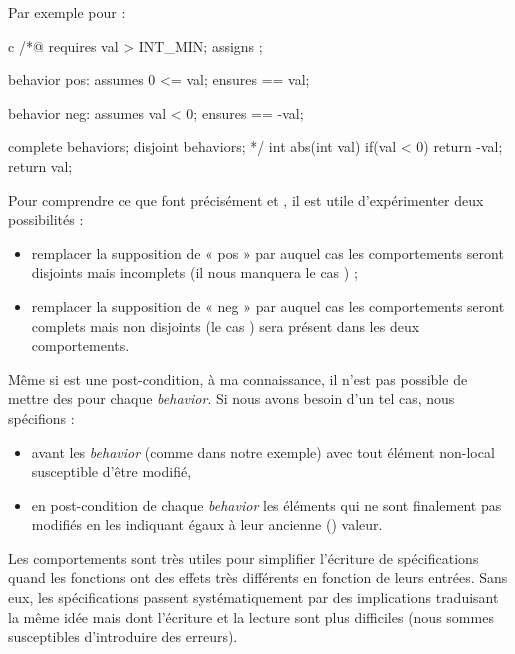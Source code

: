 \documentclass[middle]{zmdocument}
\begin{document}
Par exemple pour  :



\begin{CodeBlock}{c}
/*@
  requires val > INT_MIN;
  assigns  \nothing;

  behavior pos:
    assumes 0 <= val;
    ensures \result == val;
  
  behavior neg:
    assumes val < 0;
    ensures \result == -val;
 
  complete behaviors;
  disjoint behaviors;
*/
int abs(int val){
  if(val < 0) return -val;
  return val;
}
\end{CodeBlock}



Pour comprendre ce que font précisément  et , il est utile
d'expérimenter deux possibilités :



\begin{itemize}
\item remplacer la supposition de « pos » par  auquel cas les 
comportements seront disjoints mais incomplets (il nous manquera le cas 
) ;
\item remplacer la supposition de « neg » par  auquel cas les 
comportements seront complets mais non disjoints (le cas ) sera
présent dans les deux comportements.
\end{itemize}


\begin{Warning}
Même si  est une post-condition, à ma connaissance, il n'est pas 
possible de mettre des  pour chaque \textit{behavior}. Si nous avons
besoin d'un tel cas, nous spécifions :

\begin{itemize}
\item {} avant les \textit{behavior} (comme dans notre exemple) avec tout 
élément non-local susceptible d'être modifié,
\item en post-condition de chaque \textit{behavior} les éléments qui ne sont finalement 
pas modifiés en les indiquant égaux à leur ancienne () valeur.
\end{itemize}
\end{Warning}


Les comportements sont très utiles pour simplifier l'écriture de spécifications
quand les fonctions ont des effets très différents en fonction de leurs 
entrées. Sans eux, les spécifications passent systématiquement par des 
implications traduisant la même idée mais dont l'écriture et la lecture sont 
plus difficiles (nous sommes susceptibles d'introduire des erreurs).
\end{document}
